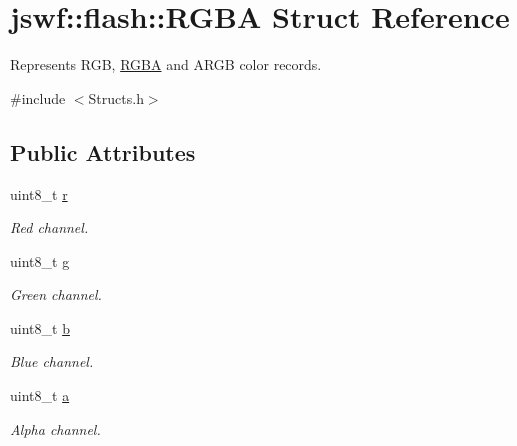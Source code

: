 \hypertarget{structjswf_1_1flash_1_1_r_g_b_a}{\section{jswf\+:\+:flash\+:\+:R\+G\+B\+A Struct Reference}
\label{structjswf_1_1flash_1_1_r_g_b_a}
}


Represents {\ttfamily R\+G\+B}, {\ttfamily \hyperlink{structjswf_1_1flash_1_1_r_g_b_a}{R\+G\+B\+A}} and {\ttfamily A\+R\+G\+B} color records.  




{\ttfamily \#include $<$Structs.\+h$>$}

\subsection*{Public Attributes}
\begin{DoxyCompactItemize}
\item 
\hypertarget{structjswf_1_1flash_1_1_r_g_b_a_a0953efe13dcc84147f3d237fda60db08}{uint8\+\_\+t \hyperlink{structjswf_1_1flash_1_1_r_g_b_a_a0953efe13dcc84147f3d237fda60db08}{r}}\label{structjswf_1_1flash_1_1_r_g_b_a_a0953efe13dcc84147f3d237fda60db08}

\begin{DoxyCompactList}\small\item\em Red channel. \end{DoxyCompactList}\item 
\hypertarget{structjswf_1_1flash_1_1_r_g_b_a_a6679918819258e0a43e6f87b02b7ad00}{uint8\+\_\+t \hyperlink{structjswf_1_1flash_1_1_r_g_b_a_a6679918819258e0a43e6f87b02b7ad00}{g}}\label{structjswf_1_1flash_1_1_r_g_b_a_a6679918819258e0a43e6f87b02b7ad00}

\begin{DoxyCompactList}\small\item\em Green channel. \end{DoxyCompactList}\item 
\hypertarget{structjswf_1_1flash_1_1_r_g_b_a_a8b2760e3f7cc62184a54fff5da992567}{uint8\+\_\+t \hyperlink{structjswf_1_1flash_1_1_r_g_b_a_a8b2760e3f7cc62184a54fff5da992567}{b}}\label{structjswf_1_1flash_1_1_r_g_b_a_a8b2760e3f7cc62184a54fff5da992567}

\begin{DoxyCompactList}\small\item\em Blue channel. \end{DoxyCompactList}\item 
\hypertarget{structjswf_1_1flash_1_1_r_g_b_a_a0b4ea9a7035a7e656db8f3b6401b956a}{uint8\+\_\+t \hyperlink{structjswf_1_1flash_1_1_r_g_b_a_a0b4ea9a7035a7e656db8f3b6401b956a}{a}}\label{structjswf_1_1flash_1_1_r_g_b_a_a0b4ea9a7035a7e656db8f3b6401b956a}

\begin{DoxyCompactList}\small\item\em Alpha channel. \end{DoxyCompactList}\end{DoxyCompactItemize}



